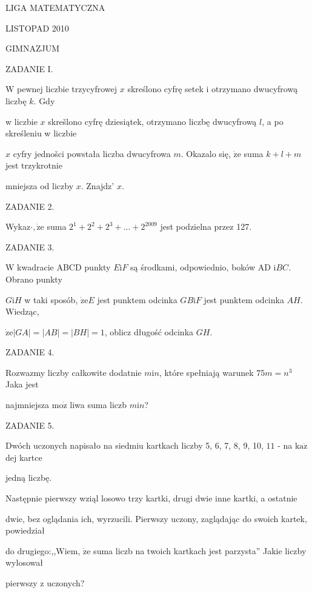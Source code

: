 \documentclass[a4paper,12pt]{article}
\begin{document}
LIGA MATEMATYCZNA

LISTOPAD 2010

GIMNAZJUM

ZADANIE I.

$\mathrm{W}$ pewnej liczbie trzycyfrowej $x$ skreślono cyfrę setek i otrzymano dwucyfrową liczbę $k$. Gdy

w liczbie $x$ skrešlono cyfrę dziesiątek, otrzymano liczbę dwucyfrową $l$, a po skreśleniu w liczbie

$x$ cyfry jednošci powstała liczba dwucyfrowa $m$. Okazalo się, $\dot{\mathrm{z}}\mathrm{e}$ suma $k+l+m$ jest trzykrotnie

mniejsza od liczby $x$. Znajdz' $x.$

ZADANIE 2.

Wykaz$\cdot, \dot{\mathrm{z}}\mathrm{e}$ suma $2^{1}+2^{2}+2^{3}+\ldots+2^{2009}$ jest podzielna przez 127.

ZADANIE 3.

$\mathrm{W}$ kwadracie ABCD punkty $E\mathrm{i}F$ są środkami, odpowiednio, boków AD $\mathrm{i}BC$. Obrano punkty

$G\mathrm{i}H$ w taki sposób, $\dot{\mathrm{z}}\mathrm{e}E$ jest punktem odcinka $GB\mathrm{i}F$ jest punktem odcinka $AH$. Wiedząc,

$\dot{\mathrm{z}}\mathrm{e}|GA|=|AB|=|BH|=1$, oblicz długość odcinka $GH.$

ZADANIE 4.

Rozwazmy liczby całkowite dodatnie $m \mathrm{i} n$, które spełniają warunek $75m = n^{3}$ Jaka jest

najmniejsza $\mathrm{m}\mathrm{o}\dot{\mathrm{z}}$ liwa suma liczb $m\mathrm{i}n$?

ZADANIE 5.

Dwóch uczonych napisało na siedmiu kartkach liczby 5, 6, 7, 8, 9, 10, $11$ - na $\mathrm{k}\mathrm{a}\dot{\mathrm{z}}$ dej kartce

jedną liczbę.

Następnie pierwszy wziąl losowo trzy kartki, drugi dwie inne kartki, a ostatnie

dwie, bez oglądania ich, wyrzucili. Pierwszy uczony, zaglądając do swoich kartek, powiedział

do drugiego:,,Wiem, $\dot{\mathrm{z}}\mathrm{e}$ suma liczb na twoich kartkach jest parzysta'' Jakie liczby wylosował

pierwszy z uczonych?
\end{document}
